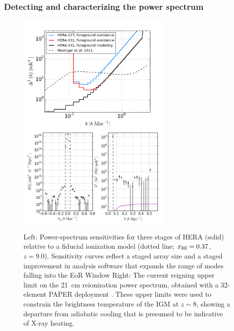 \documentclass[preprint]{aastex}
\def\HI{{H{\small I }}}
\def\xHI{{x_{\rm\HI}}}
\begin{document}
\subsubsection{Detecting and characterizing the power spectrum}
\begin{figure}[t]\centering
\includegraphics[width=3in]{plots/Pspec/eor_pspec_2014.png}
\includegraphics[width=3in]{plots/Pspec/pk_k3pk.png}
\caption{Left: Power-spectrum sensitivities for three stages of
HERA (solid) relative to a fiducial ionization model (dotted line; $\xHI=0.37$, $z=9.0$).  
Sensitivity curves reflect a staged array size and
a staged improvement in analysis software that expands the range
of modes falling into the EoR Window \label{fig:PspecSensitivity}
Right: The current reigning upper limit on the 21~cm reionization power spectrum,
obtained with a 32-element PAPER deployment \citep{parsons_et_al2013}.  These upper limits
were used to constrain the brightness temperature of the IGM at $z\sim8$, showing
a departure from adiabatic cooling that is presumed to be indicative of X-ray heating.
}
\end{figure}
\end{document}
